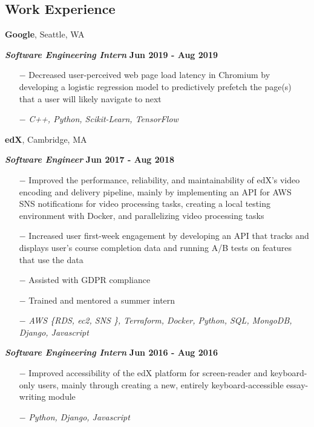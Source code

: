 \documentclass[margin,line]{res}
\begin{document}
\begin{resume}
\section{\sc Work Experience}
{\bf Google}, Seattle, WA

\vspace{-.4cm}
\textbf{\em Software Engineering Intern} \hfill {\bf Jun 2019 - Aug 2019}
\begin{itemize}
  \setlength\itemsep{-.2em}
  \item[$-$] Decreased user-perceived web page load latency in Chromium by developing a logistic regression model to predictively prefetch the page(s) that a user will likely navigate to next
  \item[$-$] \textit{C++, Python, Scikit-Learn, TensorFlow}
\end{itemize}

{\bf edX}, Cambridge, MA

\vspace{-.4cm}
{\bf \em Software Engineer} \hfill {\bf Jun 2017 - Aug 2018}
\begin{itemize}
  \setlength\itemsep{-.2em}
  \item[$-$] Improved the performance, reliability, and maintainability of edX's video encoding and delivery pipeline, mainly by implementing an API for AWS SNS notifications for video processing tasks, creating a local testing environment with Docker, and parallelizing video processing tasks 
  \item[$-$] Increased user first-week engagement by developing an API that tracks and displays user's course completion data and running A/B tests on features that use the data
  \item[$-$] Assisted with GDPR compliance
  \item[$-$] Trained and mentored a summer intern
  \item[$-$] \textit{AWS \{RDS, ec2, SNS \}, Terraform, Docker, Python, SQL, MongoDB, Django, Javascript}
\end{itemize}

\vspace{-.3cm}
{\bf \em Software Engineering Intern} \hfill {\bf Jun 2016 - Aug 2016}
\begin{itemize}
  \setlength\itemsep{-.2em} 
  \item[$-$] Improved accessibility of the edX platform for screen-reader and keyboard-only users, mainly through creating a new, entirely keyboard-accessible essay-writing module
  \item[$-$] \textit{Python, Django, Javascript}
\end{itemize}


\end{resume}
\end{document}
